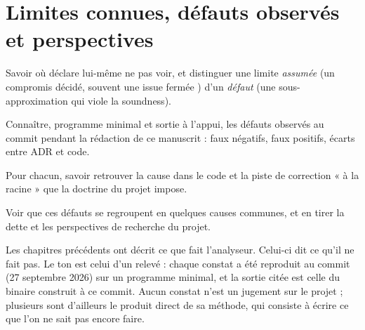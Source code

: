 \chapter{Limites connues, défauts observés et perspectives}
\label{chap:limites-perspectives}

\begin{objectifs}
\item Savoir où \reactant{} déclare lui-même ne pas voir, et distinguer une limite \emph{assumée} (un compromis décidé, souvent une issue fermée ) d'un \emph{défaut} (une sous-approximation qui viole la soundness).
\item Connaître, programme minimal et sortie à l'appui, les défauts observés au commit \snapshotCommit{} pendant la rédaction de ce manuscrit : faux négatifs, faux positifs, écarts entre ADR et code.
\item Pour chacun, savoir retrouver la cause dans le code et la piste de correction « à la racine » que la doctrine du projet impose.
\item Voir que ces défauts se regroupent en quelques causes communes, et en tirer la dette et les perspectives de recherche du projet.
\end{objectifs}


Les chapitres précédents ont décrit ce que fait l'analyseur. Celui-ci dit ce qu'il ne fait pas. Le ton est celui d'un relevé : chaque constat a été reproduit au commit \snapshotCommit{} (27 septembre 2026) sur un programme minimal, et la sortie citée est celle du binaire  construit à ce commit. Aucun constat n'est un jugement sur le projet ; plusieurs sont d'ailleurs le produit direct de sa méthode, qui consiste à écrire ce que l'on ne sait pas encore faire.

